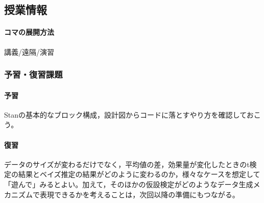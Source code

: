 \subsection{授業情報}
\paragraph{コマの展開方法}
講義/遠隔/演習
\subsubsection{予習・復習課題}
\paragraph{予習}Stanの基本的なブロック構成，設計図からコードに落とすやり方を確認しておこう。
\paragraph{復習}データのサイズが変わるだけでなく，平均値の差，効果量が変化したときのt検定の結果とベイズ推定の結果がどのように変わるのか，様々なケースを想定して「遊んで」みるとよい。加えて，そのほかの仮設検定がどのようなデータ生成メカニズムで表現できるかを考えることは，次回以降の準備にもつながる。